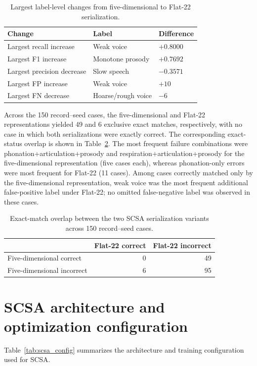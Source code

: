 \documentclass[10pt]{article}
\begin{document}
\begin{table}[h]
\centering
\caption{Largest label-level changes from five-dimensional to Flat-22 serialization.}
\label{tab:flat22_label_changes}
\small
\begin{tabular}{lll}
\toprule
Change & Label & Difference \\
\midrule
Largest recall increase & Weak voice & $+0.8000$ \\
Largest F1 increase & Monotone prosody & $+0.7692$ \\
Largest precision decrease & Slow speech & $-0.3571$ \\
Largest FP increase & Weak voice & $+10$ \\
Largest FN decrease & Hoarse/rough voice & $-6$ \\
\bottomrule
\end{tabular}
\end{table}

Across the 150 record--seed cases, the five-dimensional and Flat-22 representations yielded 49 and 6 exclusive exact matches, respectively, with no case in which both serializations were exactly correct. The corresponding exact-status overlap is shown in Table~\ref{tab:flat22_exact_overlap}. The most frequent failure combinations were phonation+articulation+prosody and respiration+articulation+prosody for the five-dimensional representation (five cases each), whereas phonation-only errors were most frequent for Flat-22 (11 cases). Among cases correctly matched only by the five-dimensional representation, weak voice was the most frequent additional false-positive label under Flat-22; no omitted false-negative label was observed in these cases.

\begin{table}[h]
\centering
\caption{Exact-match overlap between the two SCSA serialization variants across 150 record--seed cases.}
\label{tab:flat22_exact_overlap}
\small
\begin{tabular}{lrr}
\toprule
 & Flat-22 correct & Flat-22 incorrect \\
\midrule
Five-dimensional correct   & 0 & 49 \\
Five-dimensional incorrect & 6 & 95 \\
\bottomrule
\end{tabular}
\end{table}


\section{SCSA architecture and optimization configuration}
Table~\ref{tab:scsa_config} summarizes the architecture and training configuration used for SCSA. 
\end{document}
